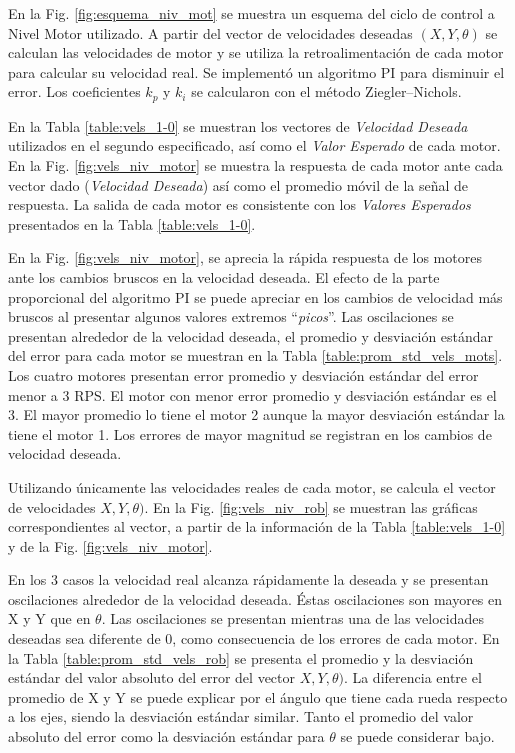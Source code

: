 {En la Fig.  \ref{fig:esquema_niv_mot} se muestra un esquema del ciclo de control a Nivel Motor utilizado. A partir del vector de velocidades deseadas \((X, Y, \theta) \) se calculan las velocidades de motor y se utiliza la retroalimentación de cada motor para calcular su velocidad real. Se implementó un algoritmo PI para disminuir el error. Los coeficientes \( k_p \) y \( k_i \) se calcularon con el método Ziegler–Nichols. \par
En la Tabla \ref{table:vels_1-0} se muestran los vectores de \textit{Velocidad Deseada} utilizados en el segundo especificado, así como el \textit{Valor Esperado} de cada motor. En la Fig. \ref{fig:vels_niv_motor} se muestra la respuesta de cada motor ante cada vector dado (\textit{Velocidad Deseada}) así como el promedio móvil de la señal de respuesta. La salida de cada motor es consistente con los \textit{Valores Esperados} presentados en la Tabla \ref{table:vels_1-0}. \par
En la Fig. \ref{fig:vels_niv_motor}, se aprecia la rápida respuesta de los motores ante los cambios bruscos en la velocidad deseada. El efecto de la parte proporcional del algoritmo PI se puede apreciar en los cambios de velocidad más bruscos al presentar algunos valores extremos ``\textit{picos}''. Las oscilaciones se presentan alrededor de la velocidad deseada, el promedio y desviación estándar del error para cada motor se muestran en la Tabla \ref{table:prom_std_vels_mots}. Los cuatro motores presentan error promedio y desviación estándar del error menor a 3 RPS. El motor con menor error promedio y desviación estándar es el 3. El mayor promedio lo tiene el motor 2 aunque la mayor desviación estándar la tiene el motor 1. Los errores de mayor magnitud se registran en los cambios de velocidad deseada. \par
Utilizando únicamente las velocidades reales de cada motor, se calcula el vector de velocidades \( X, Y, \theta ) \). En la Fig. \ref{fig:vels_niv_rob} se muestran las gráficas correspondientes al vector, a partir de la información de la Tabla \ref{table:vels_1-0} y de la Fig. \ref{fig:vels_niv_motor}. \par

En los 3 casos la velocidad real alcanza rápidamente la deseada y se presentan oscilaciones alrededor de la velocidad deseada. Éstas oscilaciones son mayores en X y Y que en \(\theta\). Las oscilaciones se presentan mientras una de las velocidades deseadas sea diferente de 0, como consecuencia de los errores de cada motor. En la Tabla \ref{table:prom_std_vels_rob} se presenta el promedio y la desviación estándar del valor absoluto del error del vector \(X, Y, \theta ) \). La diferencia entre el promedio de X y Y se puede explicar por el ángulo que tiene cada rueda respecto a los ejes, siendo la desviación estándar similar. Tanto el promedio del valor absoluto del error como la desviación estándar para \(\theta\) se puede considerar bajo. \par

}
